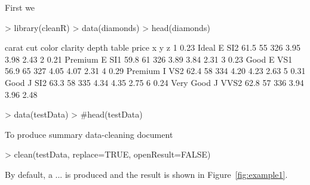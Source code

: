 \documentclass[article]{jss}
\begin{document}
First we
\begin{Schunk}
\begin{Sinput}
> library(cleanR)
> data(diamonds)
> head(diamonds)
\end{Sinput}
\begin{Soutput}
  carat       cut color clarity depth table price    x    y    z
1  0.23     Ideal     E     SI2  61.5    55   326 3.95 3.98 2.43
2  0.21   Premium     E     SI1  59.8    61   326 3.89 3.84 2.31
3  0.23      Good     E     VS1  56.9    65   327 4.05 4.07 2.31
4  0.29   Premium     I     VS2  62.4    58   334 4.20 4.23 2.63
5  0.31      Good     J     SI2  63.3    58   335 4.34 4.35 2.75
6  0.24 Very Good     J    VVS2  62.8    57   336 3.94 3.96 2.48
\end{Soutput}
\begin{Sinput}
> data(testData)
> #head(testData)
\end{Sinput}
\end{Schunk}

To produce summary data-cleaning document

\begin{Schunk}
\begin{Sinput}
> clean(testData, replace=TRUE, openResult=FALSE)
\end{Sinput}
\end{Schunk}

By default, a ... is produced and the result is shown in
Figure~\ref{fig:example1}.
\end{document}
